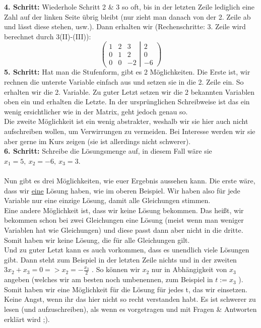 \textbf{4. Schritt:} Wiederhole Schritt 2 \& 3 so oft, bis in der letzten Zeile lediglich eine Zahl auf der linken Seite übrig bleibt (nur zieht man danach von der 2. Zeile ab und lässt diese stehen, usw.). Dann erhalten wir (Rechenschritte: 3. Zeile wird berechnet durch 3(II)-(III)):
\[
\left(
 \begin{matrix}
  1 & 2 & 3\\
  0 & 1 & 2\\
  0 & 0 & -2
 \end{matrix}
 \left|
  \begin{matrix}
   2\\
   0\\
   -6
  \end{matrix}
 \right)
\right.
\]
\textbf{5. Schritt:} Hat man die Stufenform, gibt es 2 Möglichkeiten. Die Erste ist, wir rechnen die unterste Variable einfach aus und setzen sie in die 2. Zeile ein. So erhalten wir die 2. Variable. Zu guter Letzt setzen wir die 2 bekannten Variablen oben ein und erhalten die Letzte. In der ursprünglichen Schreibweise ist das ein wenig ersichtlicher wie in der Matrix, geht jedoch genau so.\\
Die zweite Möglichkeit ist ein wenig abstrakter, weshalb wir sie hier auch nicht aufschreiben wollen, um Verwirrungen zu vermeiden. Bei Interesse werden wir sie aber gerne im Kurs zeigen (sie ist allerdings nicht schwerer).\\
\textbf{6. Schritt:} Schreibe die Lösungsmenge auf, in diesem Fall wäre sie \(x_1 = 5,\ x_2 =-6,\ x_3 = 3\). \\ \\
Nun gibt es drei Möglichkeiten, wie euer Ergebnis aussehen kann. Die erste wäre, dass wir \underline{eine} Lösung haben, wie im oberen Beispiel. Wir haben also für jede Variable nur eine einzige Lösung, damit alle Gleichungen stimmen.\\
Eine andere Möglichkeit ist, dass wir keine Lösung bekommen. Das heißt, wir bekommen schon bei zwei Gleichungen eine Lösung (meist wenn man weniger Variablen hat wie Gleichungen) und diese passt dann aber nicht in die dritte. Somit haben wir keine Lösung, die für alle Gleichungen gilt.\\
Und zu guter Letzt kann es auch vorkommen, dass es unendlich viele Lösungen gibt. Dann steht zum Beispiel in der letzten Zeile nichts und in der zweiten \(3x_2 + x_3 = 0 => x_2 = - \frac{x_3}{2}\) . So können wir \(x_2\) nur in Abhängigkeit von \(x_3\) angeben (welches wir am besten noch umbenennen, zum Beispiel in \(t := x_3\) ). Somit haben wir eine Möglichkeit für die Lösung für jedes t, das wir einsetzen.\\
Keine Angst, wenn ihr das hier nicht so recht verstanden habt. Es ist schwerer zu lesen (und aufzuschreiben), als wenn es vorgetragen und mit Fragen \& Antworten erklärt wird ;).
